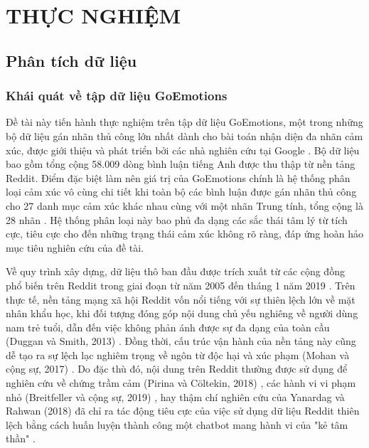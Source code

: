 
\chapter{THỰC NGHIỆM} %

\label{Chapter3} %


\section{Phân tích dữ liệu}

\subsection{Khái quát về tập dữ liệu GoEmotions}

Đề tài này tiến hành thực nghiệm trên tập dữ liệu GoEmotions, một trong những bộ dữ liệu gán nhãn thủ công lớn nhất dành cho bài toán nhận diện đa nhãn cảm xúc, được giới thiệu và phát triển bởi các nhà nghiên cứu tại Google \cite{demszky2020goemotions}. Bộ dữ liệu bao gồm tổng cộng 58.009 dòng bình luận tiếng Anh được thu thập từ nền tảng Reddit. Điểm đặc biệt làm nên giá trị của GoEmotions chính là hệ thống phân loại cảm xúc vô cùng chi tiết khi toàn bộ các bình luận được gán nhãn thủ công cho 27 danh mục cảm xúc khác nhau cùng với một nhãn Trung tính, tổng cộng là 28 nhãn \cite{demszky2020goemotions}. Hệ thống phân loại này bao phủ đa dạng các sắc thái tâm lý từ tích cực, tiêu cực cho đến những trạng thái cảm xúc không rõ ràng, đáp ứng hoàn hảo mục tiêu nghiên cứu của đề tài.

Về quy trình xây dựng, dữ liệu thô ban đầu được trích xuất từ các cộng đồng phổ biến trên Reddit trong giai đoạn từ năm 2005 đến tháng 1 năm 2019 \cite{demszky2020goemotions}. Trên thực tế, nền tảng mạng xã hội Reddit vốn nổi tiếng với sự thiên lệch lớn về mặt nhân khẩu học, khi đối tượng đóng góp nội dung chủ yếu nghiêng về người dùng nam trẻ tuổi, dẫn đến việc không phản ánh được sự đa dạng của toàn cầu (Duggan và Smith, 2013) \cite{demszky2020goemotions}. Đồng thời, cấu trúc vận hành của nền tảng này cũng dễ tạo ra sự lệch lạc nghiêm trọng về ngôn từ độc hại và xúc phạm (Mohan và cộng sự, 2017) \cite{demszky2020goemotions}. Do đặc thù đó, nội dung trên Reddit thường được sử dụng để nghiên cứu về chứng trầm cảm (Pirina và Cöltekin, 2018) \cite{demszky2020goemotions}, các hành vi vi phạm nhỏ (Breitfeller và cộng sự, 2019) \cite{demszky2020goemotions}, hay thậm chí nghiên cứu của Yanardag và Rahwan (2018) đã chỉ ra tác động tiêu cực của việc sử dụng dữ liệu Reddit thiên lệch bằng cách huấn luyện thành công một chatbot mang hành vi của "kẻ tâm thần" \cite{demszky2020goemotions}.

